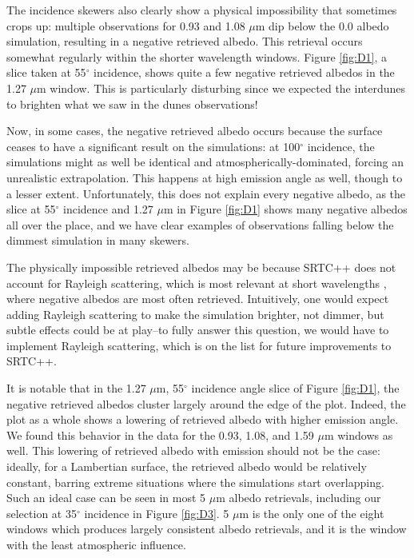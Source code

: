 \documentclass[twocolumn,linenumbers]{aastex631}
\begin{document}
The incidence skewers also clearly show a physical impossibility that sometimes crops up: multiple observations for 0.93 and 1.08 $\mu$m dip below the 0.0 albedo simulation, resulting in a negative retrieved albedo. This retrieval occurs somewhat regularly within the shorter wavelength windows. Figure \ref{fig:D1}, a slice taken at 55$^{\circ}$ incidence, shows quite a few negative retrieved albedos in the 1.27 $\mu$m window. This is particularly disturbing since we expected the interdunes to brighten what we saw in the dunes observations!

Now, in some cases, the negative retrieved albedo occurs because the surface ceases to have a significant result on the simulations: at 100$^{\circ}$ incidence, the simulations might as well be identical and atmospherically-dominated, forcing an unrealistic extrapolation. This happens at high emission angle as well, though to a lesser extent. Unfortunately, this does not explain every negative albedo, as the slice at 55$^{\circ}$ incidence and 1.27 $\mu$m in Figure \ref{fig:D1} shows many negative albedos all over the place, and we have clear examples of observations falling below the dimmest simulation in many skewers.

The physically impossible retrieved albedos may be because SRTC++ does not account for Rayleigh scattering, which is most relevant at short wavelengths \citep{EsSayeh2023}, where negative albedos are most often retrieved. Intuitively, one would expect adding Rayleigh scattering to make the simulation brighter, not dimmer, but subtle effects could be at play--to fully answer this question, we would have to implement Rayleigh scattering, which is on the list for future improvements to SRTC++.

It is notable that in the 1.27 $\mu$m, 55$^{\circ}$ incidence angle slice of Figure \ref{fig:D1}, the negative retrieved albedos cluster largely around the edge of the plot. Indeed, the plot as a whole shows a lowering of retrieved albedo with higher emission angle. We found this behavior in the data for the 0.93, 1.08, and 1.59 $\mu$m windows as well. This lowering of retrieved albedo with emission should not be the case: ideally, for a Lambertian surface, the retrieved albedo would be relatively constant, barring extreme situations where the simulations start overlapping. Such an ideal case can be seen in most 5 $\mu$m albedo retrievals, including our selection at 35$^{\circ}$ incidence in Figure \ref{fig:D3}. 5 $\mu$m is the only one of the eight windows which produces largely consistent albedo retrievals, and it is the window with the least atmospheric influence.
\end{document}
